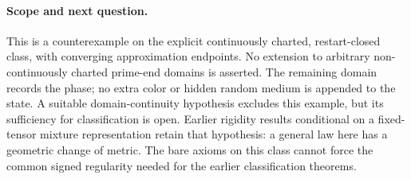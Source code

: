\paragraph{Scope and next question.}
This is a counterexample on the explicit continuously charted,
restart-closed class, with converging approximation endpoints.
No extension to arbitrary non-continuously charted prime-end
domains is asserted. The remaining domain records the phase;
no extra color or hidden random medium is appended to the state.
A suitable domain-continuity hypothesis excludes this example,
but its sufficiency for classification is open. Earlier rigidity
results conditional on a fixed-tensor mixture representation retain
that hypothesis: a general law here has a geometric change of metric.
The bare axioms on this class cannot force the common signed
regularity needed for the earlier classification theorems.
